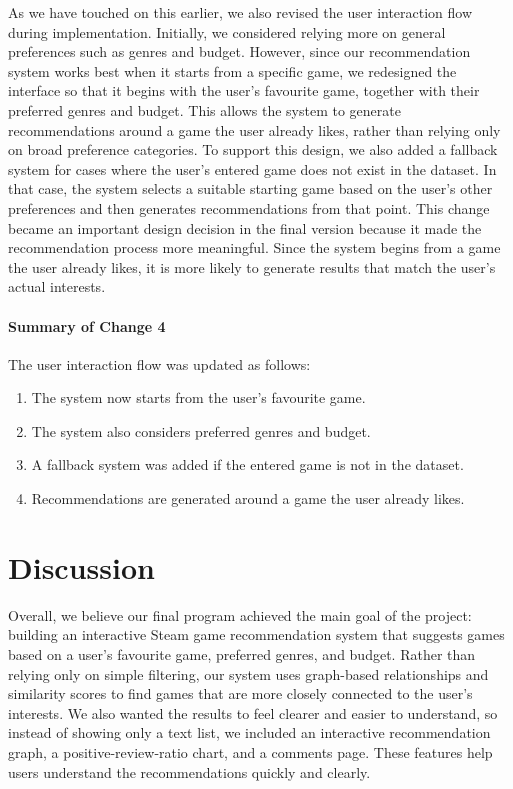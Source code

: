 \documentclass[fontsize=11pt]{article}
\begin{document}
As we have touched on this earlier, we also revised the user interaction flow during implementation. Initially, we considered relying more on general preferences such as genres and budget. However, since our recommendation system works best when it starts from a specific game, we redesigned the interface so that it begins with the user’s favourite game, together with their preferred genres and budget. This allows the system to generate recommendations around a game the user already likes, rather than relying only on broad preference categories. To support this design, we also added a fallback system for cases where the user’s entered game does not exist in the dataset. In that case, the system selects a suitable starting game based on the user’s other preferences and then generates recommendations from that point. This change became an important design decision in the final version because it made the recommendation process more meaningful. Since the system begins from a game the user already likes, it is more likely to generate results that match the user’s actual interests.

\paragraph{Summary of Change 4}
The user interaction flow was updated as follows:
\begin{enumerate}
    \item The system now starts from the user’s favourite game.
    \item The system also considers preferred genres and budget.
    \item A fallback system was added if the entered game is not in the dataset.
    \item Recommendations are generated around a game the user already likes.
\end{enumerate}

\newpage
\section*{Discussion}

Overall, we believe our final program achieved the main goal of the project: building an interactive Steam game recommendation system that suggests games based on a user’s favourite game, preferred genres, and budget. Rather than relying only on simple filtering, our system uses graph-based relationships and similarity scores to find games that are more closely connected to the user’s interests. We also wanted the results to feel clearer and easier to understand, so instead of showing only a text list, we included an interactive recommendation graph, a positive-review-ratio chart, and a comments page. These features help users understand the recommendations quickly and clearly.
\end{document}
